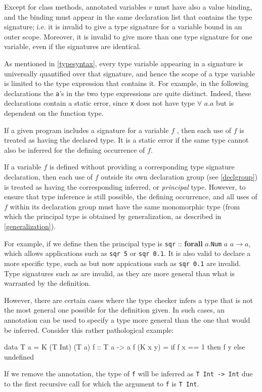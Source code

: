Except for class methods, annotated variables $v$ must have also a value binding, and the binding must appear in the same declaration list that contains the type signature; i.e. it is invalid
to give a type signature for a variable bound in an outer scope. Moreover, it is invalid to give more than one type signature for one variable, even if the signatures are identical.

As mentioned in \autoref{typesyntax}, every type variable appearing in a signature is universally quantified over that signature, and hence the scope of a type variable is limited to the type expression that contains it.
For example, in the following declarations 
the \texttt{a}'s in the two type expressions are quite distinct.
Indeed, these declarations contain a static error, since \texttt{x} does not have type $\forall$ $a$.$a$ but is dependent on the function type.

If a given program includes a signature for a variable $f$ , then each use of $f$ is treated as having the declared type.
It is a static error if the same type cannot also be inferred for the defining occurrence of $f$.

If a variable $f$ is defined without providing a corresponding type signature declaration, then each use of $f$ outside its own declaration group (see \autoref{declgroup}) is treated as having the corresponding inferred, or \emph{principal} type.
However, to ensure that type inference is still possible, the defining occurrence, and all uses of $f$ within its declaration group must have the same monomorphic type (from which the principal type is obtained by generalization, as described in \autoref{generalization}).

For example, if we define 
then the principal type is \texttt{sqr} :: \textbf{forall} $a$.\texttt{Num} $a$ \sym{=>} $a \rightarrow{} a$, which allows applications such as \texttt{sqr 5} or \texttt{sqr 0.1}.
It is also valid to declare a more specific type, such as  but now appications such as \texttt{sqr 0.1} are invalid. Type signatures such as  are invalid, as they are more general than what is warranted by the definition.

However, there are certain cases where the type checker infers a type that is not the most general one possible for the definition given. In such cases, an annotation can be used to specify a type more general than the one that would be inferred. Consider this rather pathological example:
\begin{code}
data T a = K (T Int) (T a)
f :: T a -> a
f (K x y) = if f x == 1 then f y else undefined
\end{code}
If we remove the annotation, the type of \texttt{f} will be inferred as \texttt{T Int -> Int} due to the first recursive call for which the argument to \texttt{f} is \texttt{T Int}.

